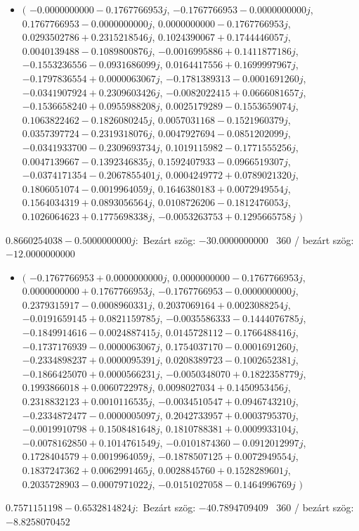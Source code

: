 \documentclass[14pt,a4paper]{article}
\begin{document}
\begin{itemize}
\item
$\big($
$-0.0000000000-0.1767766953j$, $-0.1767766953-0.0000000000j$, $0.1767766953-0.0000000000j$, $0.0000000000-0.1767766953j$, $0.0293502786+0.2315218546j$, $0.1024390067+0.1744446057j$, $0.0040139488-0.1089800876j$, $-0.0016995886+0.1411877186j$, $-0.1553236556-0.0931686099j$, $0.0164417556+0.1699997967j$, $-0.1797836554+0.0000063067j$, $-0.1781389313-0.0001691260j$, $-0.0341907924+0.2309603426j$, $-0.0082022415+0.0666081657j$, $-0.1536658240+0.0955988208j$, $0.0025179289-0.1553659074j$, $0.1063822462-0.1826080245j$, $0.0057031168-0.1521960379j$, $0.0357397724-0.2319318076j$, $0.0047927694-0.0851202099j$, $-0.0341933700-0.2309693734j$, $0.1019115982-0.1771555256j$, $0.0047139667-0.1392346835j$, $0.1592407933-0.0966519307j$, $-0.0374171354-0.2067855401j$, $0.0004249772+0.0789021320j$, $0.1806051074-0.0019964059j$, $0.1646380183+0.0072949554j$, $0.1564034319+0.0893056564j$, $0.0108726206-0.1812476053j$, $0.1026064623+0.1775698338j$, $-0.0053263753+0.1295665758j$
$\big)$
\end{itemize}
$0.8660254038-0.5000000000j$:\
Bezárt szög: $-30.0000000000$ \
360 / bezárt szög: $-12.0000000000$\
\begin{itemize}
\item
$\big($
$-0.1767766953+0.0000000000j$, $0.0000000000-0.1767766953j$, $0.0000000000+0.1767766953j$, $-0.1767766953-0.0000000000j$, $0.2379315917-0.0008960331j$, $0.2037069164+0.0023088254j$, $-0.0191659145+0.0821159785j$, $-0.0035586333-0.1444076785j$, $-0.1849914616-0.0024887415j$, $0.0145728112-0.1766488416j$, $-0.1737176939-0.0000063067j$, $0.1754037170-0.0001691260j$, $-0.2334898237+0.0000095391j$, $0.0208389723-0.1002652381j$, $-0.1866425070+0.0000566231j$, $-0.0050348070+0.1822358779j$, $0.1993866018+0.0060722978j$, $0.0098027034+0.1450953456j$, $0.2318832123+0.0010116535j$, $-0.0034510547+0.0946743210j$, $-0.2334872477-0.0000005097j$, $0.2042733957+0.0003795370j$, $-0.0019910798+0.1508481648j$, $0.1810788381+0.0009933104j$, $-0.0078162850+0.1014761549j$, $-0.0101874360-0.0912012997j$, $0.1728404579+0.0019964059j$, $-0.1878507125+0.0072949554j$, $0.1837247362+0.0062991465j$, $0.0028845760+0.1528289601j$, $0.2035728903-0.0007971022j$, $-0.0151027058-0.1464996769j$
$\big)$
\end{itemize}
$0.7571151198-0.6532814824j$:\
Bezárt szög: $-40.7894709409$ \
360 / bezárt szög: $-8.8258070452$\
\end{document}
